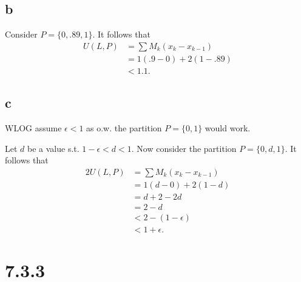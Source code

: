 \documentclass[10pt]{article}
\begin{document}
\subsection*{b}

Consider $P=\{0,.89,1\}.$ It follows that
\begin{align*}
    U(L,P) &= \sum M_k (x_k-x_{k-1})\\
    &= 1(.9-0) + 2(1-.89)\\
    &<1.1.
\end{align*}

\subsection*{c}

WLOG assume $\epsilon < 1$ as o.w. the partition $P=\{0,1\}$ would work. %

Let $d$ be a value s.t. $1-\epsilon<d<1.$ Now consider the partition $P=\{0,d, 1\}.$ It follows that
\begin{alignat*}{2}
    U(L,P) &= \sum M_k (x_k-x_{k-1})\\
    &= 1(d-0) + 2(1-d)\\
    &= d + 2 - 2d\\
    &= 2-d\\
    &< 2 - (1-\epsilon)\\ %
    &< 1+\epsilon.
\end{alignat*}

\section*{7.3.3}
\end{document}
